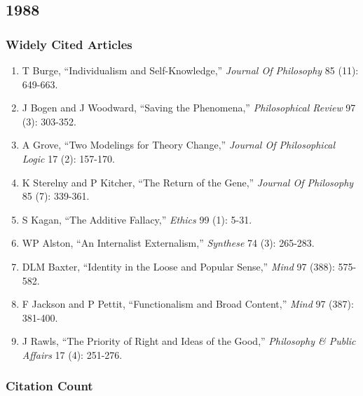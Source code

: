\documentclass[
  10pt,
  letterpaper,
  DIV=11,
  numbers=noendperiod,
  twoside]{scrartcl}
\providecommand{\tightlist}{%
  \setlength{\itemsep}{0pt}\setlength{\parskip}{0pt}}\usepackage{longtable,booktabs,array}
\begin{document}
\newpage

\subsection{1988}\label{sec-s1988}

\subsubsection*{Widely Cited Articles}\label{widely-cited-articles-12}

\begin{enumerate}
\def\labelenumi{\arabic{enumi}.}
\tightlist
\item
  T Burge, ``Individualism and Self-Knowledge,'' \emph{Journal Of
  Philosophy} 85 (11): 649-663.
\item
  J Bogen and J Woodward, ``Saving the Phenomena,'' \emph{Philosophical
  Review} 97 (3): 303-352.
\item
  A Grove, ``Two Modelings for Theory Change,'' \emph{Journal Of
  Philosophical Logic} 17 (2): 157-170.
\item
  K Sterelny and P Kitcher, ``The Return of the Gene,'' \emph{Journal Of
  Philosophy} 85 (7): 339-361.
\item
  S Kagan, ``The Additive Fallacy,'' \emph{Ethics} 99 (1): 5-31.
\item
  WP Alston, ``An Internalist Externalism,'' \emph{Synthese} 74 (3):
  265-283.
\item
  DLM Baxter, ``Identity in the Loose and Popular Sense,'' \emph{Mind}
  97 (388): 575-582.
\item
  F Jackson and P Pettit, ``Functionalism and Broad Content,''
  \emph{Mind} 97 (387): 381-400.
\item
  J Rawls, ``The Priority of Right and Ideas of the Good,''
  \emph{Philosophy \& Public Affairs} 17 (4): 251-276.
\end{enumerate}

\subsubsection*{Citation Count}\label{sec-count-1988}
\end{document}
